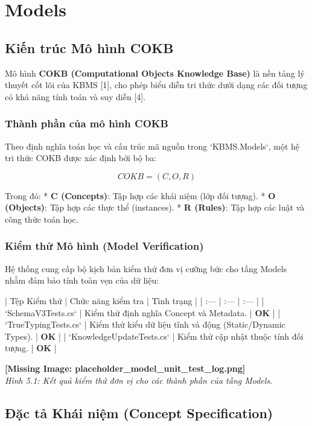 \chapter{Models}
\section{Kiến trúc Mô hình COKB}

Mô hình \textbf{COKB (Computational Objects Knowledge Base)} là nền tảng lý thuyết cốt lõi của KBMS [1], cho phép biểu diễn tri thức dưới dạng các đối tượng có khả năng tính toán và suy diễn [4].

\subsection{Thành phần của mô hình COKB}

Theo định nghĩa toán học và cấu trúc mã nguồn trong `KBMS.Models`, một hệ tri thức COKB được xác định bởi bộ ba:

\begin{equation}
COKB = (C, O, R)
\end{equation}

Trong đó:
*   \textbf{C (Concepts)}: Tập hợp các khái niệm (lớp đối tượng).
*   \textbf{O (Objects)}: Tập hợp các thực thể (instances).
*   \textbf{R (Rules)}: Tập hợp các luật và công thức toán học.

\subsection{Kiểm thử Mô hình (Model Verification)}

Hệ thống cung cấp bộ kịch bản kiểm thử đơn vị cưỡng bức cho tầng Models nhằm đảm bảo tính toàn vẹn của dữ liệu:

| Tệp Kiểm thử | Chức năng kiểm tra | Tình trạng |
| :--- | :--- | :--- |
| `SchemaV3Tests.cs` | Kiểm thử định nghĩa Concept và Metadata. | \textbf{OK} |
| `TrueTypingTests.cs` | Kiểm thử kiểu dữ liệu tĩnh và động (Static/Dynamic Types). | \textbf{OK} |
| `KnowledgeUpdateTests.cs` | Kiểm thử cập nhật thuộc tính đối tượng. | \textbf{OK} |

\textbf{[Missing Image: placeholder_model_unit_test_log.png]}\\ \textit{Hình 5.1: Kết quả kiểm thử đơn vị cho các thành phần của tầng Models.}

\section{Đặc tả Khái niệm (Concept Specification)}

